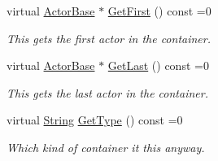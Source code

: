 \begin{DoxyCompactItemize}
virtual \hyperlink{classphys_1_1ActorBase}{ActorBase} $\ast$ \hyperlink{classphys_1_1ActorContainerBase_ae703482d84a9c6726e28a8f26418b161}{GetFirst} () const =0
\begin{DoxyCompactList}\small\item\em This gets the first actor in the container. \item\end{DoxyCompactList}\item 
virtual \hyperlink{classphys_1_1ActorBase}{ActorBase} $\ast$ \hyperlink{classphys_1_1ActorContainerBase_a8efeffd5ae22085fe01af791b3ea559e}{GetLast} () const =0
\begin{DoxyCompactList}\small\item\em This gets the last actor in the container. \item\end{DoxyCompactList}\item 
virtual \hyperlink{namespacephys_aa03900411993de7fbfec4789bc1d392e}{String} \hyperlink{classphys_1_1ActorContainerBase_a526dab176597858680490d128d0584a3}{GetType} () const =0
\begin{DoxyCompactList}\small\item\em Which kind of container it this anyway. \item\end{DoxyCompactList}\end{DoxyCompactItemize}


